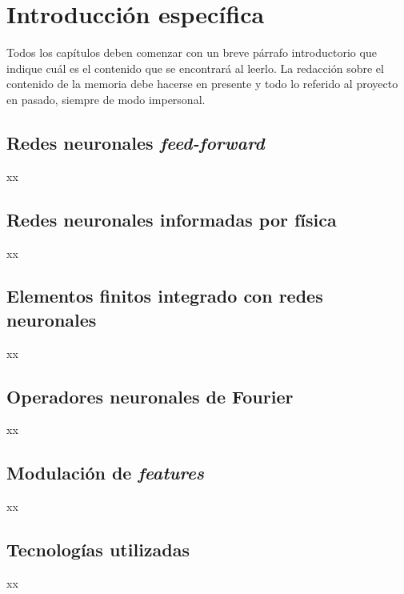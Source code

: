 \chapter{Introducción específica} %

\label{Chapter2}

Todos los capítulos deben comenzar con un breve párrafo introductorio que indique cuál es el contenido que se encontrará al leerlo.  La redacción sobre el contenido de la memoria debe hacerse en presente y todo lo referido al proyecto en pasado, siempre de modo impersonal.

\section{Redes neuronales \textit{feed-forward}}

xx

\section{Redes neuronales informadas por física}

xx

\section{Elementos finitos integrado con redes neuronales}

xx

\section{Operadores neuronales de Fourier}

xx

\section{Modulación de \textit{features}}

xx

\section{Tecnologías utilizadas}

xx

